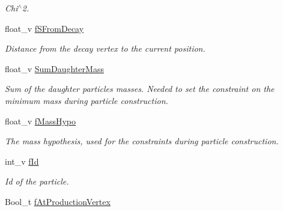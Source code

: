 \begin{DoxyCompactItemize}
\begin{DoxyCompactList}\small\item\em Chi$^\wedge$2. \end{DoxyCompactList}\item 
float\+\_\+v \hyperlink{classKFParticleBaseSIMD_a98512ef37c7e4601482403b30d47cb38}{f\+S\+From\+Decay}\hypertarget{classKFParticleBaseSIMD_a98512ef37c7e4601482403b30d47cb38}{}\label{classKFParticleBaseSIMD_a98512ef37c7e4601482403b30d47cb38}

\begin{DoxyCompactList}\small\item\em Distance from the decay vertex to the current position. \end{DoxyCompactList}\item 
float\+\_\+v \hyperlink{classKFParticleBaseSIMD_afd3f256956cf1ac57cfd88589f1a6646}{Sum\+Daughter\+Mass}\hypertarget{classKFParticleBaseSIMD_afd3f256956cf1ac57cfd88589f1a6646}{}\label{classKFParticleBaseSIMD_afd3f256956cf1ac57cfd88589f1a6646}

\begin{DoxyCompactList}\small\item\em Sum of the daughter particles masses. Needed to set the constraint on the minimum mass during particle construction. \end{DoxyCompactList}\item 
float\+\_\+v \hyperlink{classKFParticleBaseSIMD_a7ec69eabb247fa58c6e4e562cce38bdb}{f\+Mass\+Hypo}\hypertarget{classKFParticleBaseSIMD_a7ec69eabb247fa58c6e4e562cce38bdb}{}\label{classKFParticleBaseSIMD_a7ec69eabb247fa58c6e4e562cce38bdb}

\begin{DoxyCompactList}\small\item\em The mass hypothesis, used for the constraints during particle construction. \end{DoxyCompactList}\item 
int\+\_\+v \hyperlink{classKFParticleBaseSIMD_ac72c5bee98e7eed297bc7c01ba51f735}{f\+Id}\hypertarget{classKFParticleBaseSIMD_ac72c5bee98e7eed297bc7c01ba51f735}{}\label{classKFParticleBaseSIMD_ac72c5bee98e7eed297bc7c01ba51f735}

\begin{DoxyCompactList}\small\item\em Id of the particle. \end{DoxyCompactList}\item 
Bool\+\_\+t \hyperlink{classKFParticleBaseSIMD_a696499e57fbc18e3e95678c937e29035}{f\+At\+Production\+Vertex}\hypertarget{classKFParticleBaseSIMD_a696499e57fbc18e3e95678c937e29035}{}\label{classKFParticleBaseSIMD_a696499e57fbc18e3e95678c937e29035}


\end{DoxyCompactItemize}
